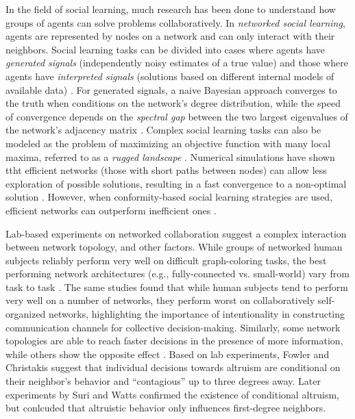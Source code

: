 \documentclass[10pt,twocolumn]{article}
\newcommand{\+}{\phantom{-}}
\begin{document}
In the field of social learning,
much research has been done to understand how groups of agents
can solve problems collaboratively.
In {\em networked social learning}, agents are represented by nodes on a network
and can only interact with their neighbors.
Social learning tasks can be divided into cases where agents have {\em generated signals}
(independently noisy estimates of a true value)
and those where agents have {\em interpreted signals}
(solutions based on different internal models of available data)
\cite{hong_interpreted_2009}.
For generated signals,
a naive Bayesian approach converges to the truth when conditions
on the network's degree distribution,
while the speed of convergence depends on the {\em spectral gap}
between the two largest eigenvalues of the network's adjacency matrix
\cite{golub_naive_2010}.
Complex social learning tasks can also be modeled as the problem
of maximizing an objective function with many local maxima,
referred to as a {\em rugged landscape}
\cite{lazer_network_2007, mason_propagation_2008, mason_collaborative_2012, grim_scientific_2013, barkoczi_social_2016}.
Numerical simulations have shown ttht efficient networks (those with short paths between nodes)
can allow less exploration of possible solutions,
resulting in a fast convergence to a non-optimal solution \cite{mason_propagation_2008, grim_scientific_2013}.
However, when conformity-based social learning strategies are used, efficient networks can outperform
inefficient ones \cite{barkoczi_social_2016}.

Lab-based experiments on networked collaboration
suggest a complex interaction between network topology,
and other factors.
While groups of networked human subjects reliably perform very well on
difficult graph-coloring tasks, the best performing network architectures
(e.g., fully-connected vs. small-world) vary
from task to task \cite{kearns_experiments_2012}.
The same studies found that while human subjects tend to perform very well on
a number of networks, they perform worst on collaboratively self-organized
networks, highlighting the importance of intentionality
in constructing communication channels for collective decision-making.
Similarly, some network topologies are able to reach faster decisions in the
presence of more information, while others show the opposite effect
\cite{kearns_experimental_2006}.
Based on lab experiments, Fowler and Christakis \cite{fowler_cooperative_2010}
suggest that individual decisions towards altruism are conditional on their
neighbor's behavior and ``contagious'' up to three degrees away.
Later experiments by Suri and Watts \cite{suri_cooperation_2011} confirmed the
existence of conditional altruism,
but conlcuded that altruistic
behavior only influences first-degree neighbors.
\end{document}
